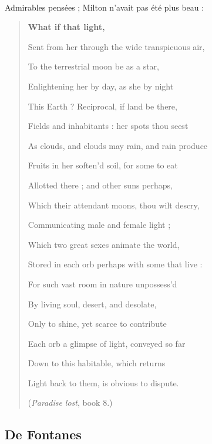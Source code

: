 \documentclass[a4paper, 11pt, oneside, landscape]{article}
\begin{document}
\paragraph{}
Admirables pensées ; Milton n'avait pas été plus beau :
\begin{quotation}\bfseries\small
\hspace*{15mm}What if that light,

Sent from her through the wide transpicuous air,

To the terrestrial moon be as a star,

Enlightening her by day, as she by night

This Earth ? Reciprocal, if land be there,

Fields and inhabitants : her spots thou seest

As clouds, and clouds may rain, and rain produce

Fruits in her soften'd soil, for some to eat

Allotted there ; and other suns perhaps,

Which their attendant moons, thou wilt descry,

Communicating male and female light ;

Which two great sexes animate the world,

Stored in each orb perhaps with some that live :

For such vast room in nature unpossess'd

By living soul, desert, and desolate,

Only to shine, yet scarce to contribute

Each orb a glimpse of light, conveyed so far

Down to this habitable, which returns

Light back to them, is obvious to dispute.

\hspace*{5mm}(\emph{Paradise lost}, book 8.)
\end{quotation}
\clearpage
\subsection{De Fontanes}
\end{document}
